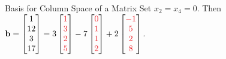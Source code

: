 \documentclass[xcolor=dvipsnames,aspectratio=169,t]{beamer}
\begin{document}
\begin{frame}{Basis for Column Space of a Matrix}
{    Set $x_2=x_4=0$.
    Then $\b=\begin{bmatrix} 1 \\ 12 \\ 3 \\ 17 \end{bmatrix} =
      3\begin{bmatrix} 
      \red{1} \\
      \red{3} \\
      \red{2} \\ 
      \red{5} 
      \end{bmatrix}
      -7
      \begin{bmatrix}
      \red{0}\\
      \red{1}\\
      \red{1}\\
      \red{2}
      \end{bmatrix}
      +2\begin{bmatrix}
      \red{-1}\\
      \red{5} \\
      \red{2} \\
      \red{8}
      \end{bmatrix}$.
    }  %
    
\end{frame}
\end{document}
